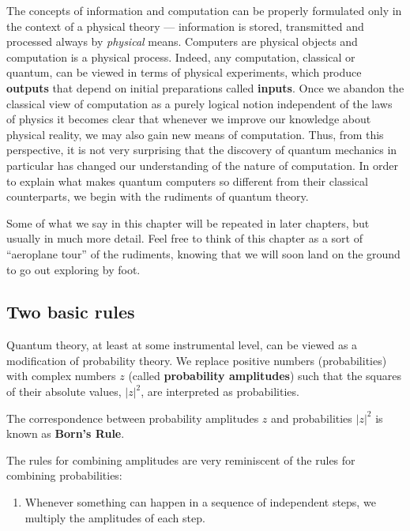 \documentclass[fleqn]{article}
\providecommand{\tightlist}{%
  \setlength{\itemsep}{0pt}\setlength{\parskip}{0pt}}
\newenvironment{idea}{\noindent}{\medskip}
\begin{document}
The concepts of information and computation can be properly formulated only in the context of a physical theory --- information is stored, transmitted and processed always by \emph{physical} means.
Computers are physical objects and computation is a physical process.
Indeed, any computation, classical or quantum, can be viewed in terms of physical experiments, which produce \textbf{outputs} that depend on initial preparations called \textbf{inputs}.
Once we abandon the classical view of computation as a purely logical notion independent of the laws of physics it becomes clear that whenever we improve our knowledge about physical reality, we may also gain new means of computation.
Thus, from this perspective, it is not very surprising that the discovery of quantum mechanics in particular has changed our understanding of the nature of computation.
In order to explain what makes quantum computers so different from their classical counterparts, we begin with the rudiments of quantum theory.

Some of what we say in this chapter will be repeated in later chapters, but usually in much more detail.
Feel free to think of this chapter as a sort of ``aeroplane tour'' of the rudiments, knowing that we will soon land on the ground to go out exploring by foot.

\hypertarget{two-basic-rules}{%
\subsection{Two basic rules}\label{two-basic-rules}}

Quantum theory, at least at some instrumental level, can be viewed as a modification of probability theory.
We replace positive numbers (probabilities) with complex numbers \(z\) (called \textbf{probability amplitudes}) such that the squares of their absolute values, \(|z|^2\), are interpreted as probabilities.

\begin{idea}
The correspondence between probability amplitudes \(z\) and probabilities \(|z|^2\) is known as \textbf{Born's Rule}.

\end{idea}

The rules for combining amplitudes are very reminiscent of the rules for combining probabilities:

\begin{enumerate}
\def\labelenumi{\arabic{enumi}.}
\tightlist
\item
  Whenever something can happen in a sequence of independent steps, we multiply the amplitudes of each step.
\end{enumerate}
\end{document}
